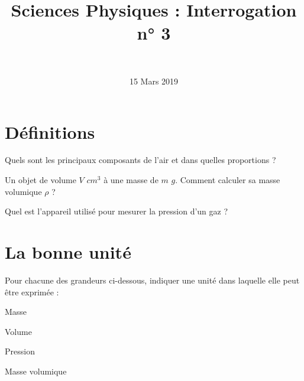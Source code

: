 \documentclass[a4paper,11pt]{exam}
\author{\ }
\date{15 Mars 2019}
\title{Sciences Physiques : Interrogation n° 3}
\begin{document}
%	

	\maketitle
%	
	
	

%

%

\section{Définitions}

\begin{questions}
	\question Quels sont les principaux composants de l'air et dans quelles proportions ?
	
	\fillwithdottedlines{1.5cm}
	
	\question Un objet de volume $V$ $cm^3$ à une masse de $m$ $g$. Comment calculer sa masse volumique $\rho$ ?
	\fillwithdottedlines{2cm}
	
	\question Quel est l'appareil utilisé pour mesurer la pression d'un gaz ? 
	\fillwithdottedlines{1cm}
\end{questions}

\section{La bonne unité}
Pour chacune des grandeurs ci-dessous, indiquer une unité dans laquelle elle peut être exprimée :

\begin{questions}
	\question Masse 
	\fillwithdottedlines{1cm}
	
	\question Volume 
	\fillwithdottedlines{1cm}
	
	\question Pression 
	\fillwithdottedlines{1cm}
	
	\question Masse volumique
	\fillwithdottedlines{1cm}
\end{questions}
\end{document}
